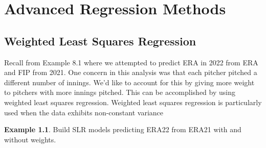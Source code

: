 \documentclass[
  11pt,
]{book}
\theoremstyle{definition}
\theoremstyle{definition}
\newtheorem{example}{Example}[chapter]
\theoremstyle{definition}
\theoremstyle{definition}
\theoremstyle{remark}
\begin{document}
\hypertarget{advanced-regression-methods}{%
\chapter{Advanced Regression Methods}\label{advanced-regression-methods}}

\hypertarget{weighted-least-squares-regression}{%
\section{Weighted Least Squares Regression}\label{weighted-least-squares-regression}}

Recall from Example 8.1 where we attempted to predict ERA in 2022 from ERA and FIP from 2021. One concern in this analysis was that each pitcher pitched a different number of innings. We'd like to account for this by giving more weight to pitchers with more innings pitched. This can be accomplished by using weighted least squares regression. Weighted least squares regression is particularly used when the data exhibits non-constant variance

\begin{example}
Build SLR models predicting ERA22 from ERA21 with and without weights.
\end{example}
\end{document}
